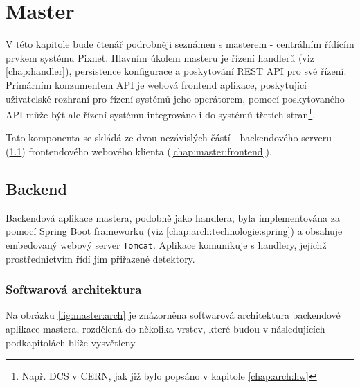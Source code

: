 

\chapter{Master}\label{chap:master}
V této kapitole bude čtenář podrobněji seznámen s masterem - centrálním řídícím prvkem systému Pixnet. Hlavním úkolem masteru je řízení handlerů (viz \ref{chap:handler}), persistence konfigurace a poskytování REST API pro své řízení. Primárním konzumentem API je webová frontend aplikace, poskytující uživatelské rozhraní pro řízení systémů jeho operátorem, pomocí poskytovaného API může být ale řízení systému integrováno i do systémů třetích stran\footnote{Např. DCS v CERN, jak již bylo popsáno v kapitole \ref{chap:arch:hw}}.

Tato komponenta se skládá ze dvou nezávislých částí - backendového serveru (\ref{chap:master:backend}) frontendového webového klienta (\ref{chap:master:frontend}).

\section{Backend}\label{chap:master:backend}
Backendová aplikace mastera, podobně jako handlera, byla implementována za pomocí Spring Boot frameworku (viz \ref{chap:arch:technologie:spring}) a obsahuje embedovaný webový server \texttt{Tomcat}. Aplikace komunikuje s handlery, jejichž prostřednictvím řídí jim přiřazené detektory.

\subsection{Softwarová architektura}\label{chap:master:backend:sw_arch}
Na obrázku \ref{fig:master:arch} je znázorněna softwarová architektura backendové aplikace mastera, rozdělená do několika vrstev, které budou v následujících podkapitolách blíže vysvětleny.

